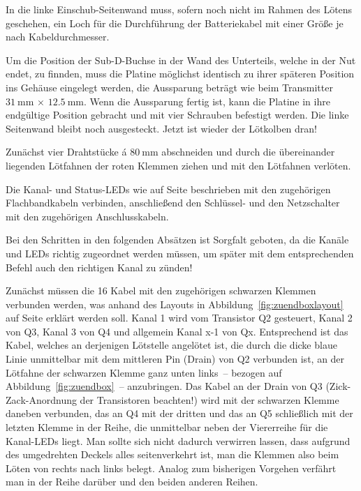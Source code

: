 \documentclass[paper=a4, parskip, numbers=noenddot, toc=listof, headsepline]{scrbook}
\begin{document}
				In die linke Einschub-Seitenwand muss, sofern noch nicht im Rahmen des Lötens geschehen, ein Loch für die Durchführung der Batteriekabel mit einer Größe je nach Kabeldurchmesser.

				Um die Position der Sub-D-Buchse in der Wand des Unterteils, welche in der Nut endet, zu finnden, muss die Platine möglichst identisch zu ihrer späteren Position ins Gehäuse eingelegt werden, die Aussparung beträgt wie beim Transmitter $\SI{31}{\milli\metre}\,\times\,\SI{12,5}{\milli\metre}$. Wenn die Aussparung fertig ist, kann die Platine in ihre endgültige Position gebracht und mit vier Schrauben befestigt werden. Die linke Seitenwand bleibt noch ausgesteckt. Jetzt ist wieder der Lötkolben dran!

				Zunächst vier Drahtstücke á $\SI{80}{\milli\metre}$ abschneiden und durch die übereinander liegenden Lötfahnen der roten Klemmen ziehen und mit den Lötfahnen verlöten.

				Die Kanal- und Status-LEDs wie auf Seite \pageref{enum:leds} beschrieben mit den zugehörigen Flachbandkabeln verbinden, anschließend den Schlüssel- und den Netzschalter mit den zugehörigen Anschlusskabeln.

				Bei den Schritten in den folgenden Absätzen ist Sorgfalt geboten, da die Kanäle und LEDs richtig zugeordnet werden müssen, um später mit dem entsprechenden Befehl auch den richtigen Kanal zu zünden!

				Zunächst müssen die 16 Kabel mit den zugehörigen schwarzen Klemmen verbunden werden, was anhand des Layouts in Abbildung~\ref{fig:zuendboxlayout} auf Seite \pageref{fig:zuendboxlayout} erklärt werden soll. Kanal 1 wird vom Transistor Q2 gesteuert, Kanal 2 von Q3, Kanal 3 von Q4 und allgemein Kanal x-1 von Qx. Entsprechend ist das Kabel, welches an derjenigen Lötstelle angelötet ist, die durch die dicke blaue Linie unmittelbar mit dem mittleren Pin (Drain) von Q2 verbunden ist, an der Lötfahne der schwarzen Klemme ganz unten links~-- bezogen auf Abbildung~\ref{fig:zuendbox}~-- anzubringen. Das Kabel an der Drain von Q3 (Zick-Zack-Anordnung der Transistoren beachten!) wird mit der schwarzen Klemme daneben verbunden, das an Q4 mit der dritten und das an Q5 schließlich mit der letzten Klemme in der Reihe, die unmittelbar neben der Viererreihe für die Kanal-LEDs liegt. Man sollte sich nicht dadurch verwirren lassen, dass aufgrund des umgedrehten Deckels alles seitenverkehrt ist, man die Klemmen also beim Löten von rechts nach links belegt. Analog zum bisherigen Vorgehen verfährt man in der Reihe darüber und den beiden anderen Reihen.
\end{document}
